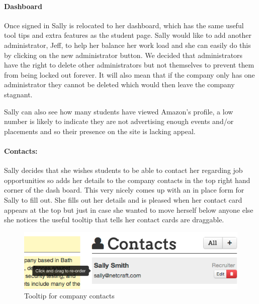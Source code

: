   \paragraph{Dashboard}
    Once signed in Sally is relocated to her dashboard, which has the same useful tool tips and extra features as the student page.
    Sally would like to add another administrator, Jeff, to help her balance her work load and she can easily do this by clicking on the new administrator button. We decided that administrators have the right to delete other administrators but not themselves to prevent them from being locked out forever. It will also mean that if the company only has one administrator they cannot be deleted which would then leave the company stagnant.

    Sally can also see how many students have viewed Amazon's profile, a low number is likely to indicate they are not advertising enough events and/or placements and so their presence on the site is lacking appeal. 


  \paragraph{Contacts:}
    Sally decides that she wishes students to be able to contact her regarding job opportunities so adds her details to the company contacts in the top right hand corner of the dash board. This very nicely comes up with an in place form for Sally to fill out.
    She fills out her details and is pleased when her contact card appears at the top but just in case she wanted to move herself below anyone else she notices the useful tooltip that tells her contact cards are draggable.

    \begin{figure}[H]\centering
    \includegraphics[scale=0.5]{images/user_experiences/company/netcraft_company_contact_tooltip}
    \caption{Tooltip for company contacts}
    \end{figure}

